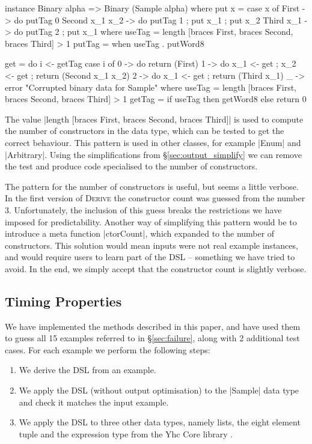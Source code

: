 \documentclass{llncs}
\newcommand{\derive}{\textsc{Derive}}
\begin{document}
\begin{code}
instance Binary alpha => Binary (Sample alpha) where
    put x = case x of
        First            -> do putTag 0
        Second  x_1 x_2  -> do putTag 1 ; put x_1 ; put x_2
        Third   x_1      -> do putTag 2 ; put x_1
        where
            useTag = length [braces First, braces Second, braces Third] > 1
            putTag = when useTag . putWord8

    get = do
        i <- getTag
        case i of
            0 -> do return (First)
            1 -> do x_1 <- get ; x_2 <- get ; return (Second x_1 x_2)
            2 -> do x_1 <- get ; return (Third x_1)
            _ -> error "Corrupted binary data for Sample"
        where
            useTag = length [braces First, braces Second, braces Third] > 1
            getTag = if useTag then getWord8 else return 0
\end{code}

The value |length [braces First, braces Second, braces Third]| is used to compute the number of constructors in the data type, which can be tested to get the correct behaviour. This pattern is used in other classes, for example |Enum| and |Arbitrary|. Using the simplifications from \S\ref{sec:output_simplify} we can remove the test and produce code specialised to the number of constructors.

The pattern for the number of constructors is useful, but seems a little verbose. In the first version of \derive{} the constructor count was guessed from the number 3. Unfortunately, the inclusion of this guess breaks the restrictions we have imposed for predictability. Another way of simplifying this pattern would be to introduce a meta function |ctorCount|, which expanded to the number of constructors. This solution would mean inputs were not real example instances, and would require users to learn part of the DSL -- something we have tried to avoid. In the end, we simply accept that the constructor count is slightly verbose.

\subsection{Timing Properties}

We have implemented the methods described in this paper, and have used them to guess all 15 examples referred to in \S\ref{sec:failure}, along with 2 additional test cases. For each example we perform the following steps:

\begin{enumerate}
\item We derive the DSL from an example.
\item We apply the DSL (without output optimisation) to the |Sample| data type and check it matches the input example.
\item We apply the DSL to three other data types, namely lists, the eight element tuple and the expression type from the Yhc Core library \cite{me:yhc_core}.
\end{enumerate}
\end{document}
